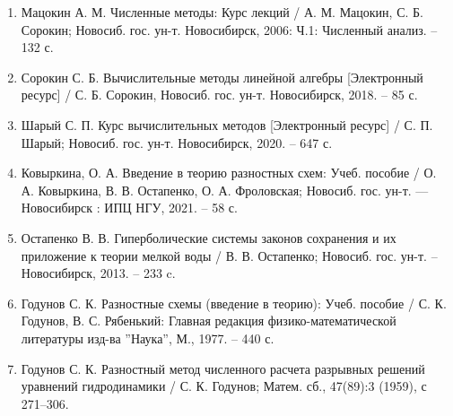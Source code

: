 \documentclass[../main.tex]{subfile}
\begin{document}
\begin{enumerate}[nosep]
	\item Мацокин А. М. Численные методы: Курс лекций / А. М. Мацокин,
		С. Б. Сорокин; Новосиб. гос. ун-т. Новосибирск, 2006: Ч.1:
		Численный анализ. -- 132 с.
	\item Сорокин С. Б. Вычислительные методы линейной алгебры [Электронный
		ресурс] / С. Б. Сорокин, Новосиб. гос. ун-т. Новосибирск, 2018.
		-- 85 с.
	\item Шарый С. П. Курс вычислительных методов [Электронный ресурс] /
		С. П. Шарый; Новосиб. гос. ун-т. Новосибирск, 2020. -- 647 с.
	\item Ковыркина, О. А. Введение в теорию разностных схем: Учеб. пособие
		/ О. А. Ковыркина, В. В. Остапенко, О. А. Фроловская; Новосиб.
		гос. ун-т. --- Новосибирск : ИПЦ НГУ, 2021. -- 58 с.
	\item Остапенко В. В. Гиперболические системы законов сохранения и их
		приложение к теории мелкой воды / В. В. Остапенко; Новосиб. гос.
		ун-т. -- Новосибирск, 2013. -- 233 c.
	\item Годунов С. К. Разностные схемы (введение в теорию): Учеб. пособие /
		С. К. Годунов, В. С. Рябенький: Главная редакция
		физико-математической литературы изд-ва ''Наука'', М., 1977. --
		440 с.
	\item Годунов С. К. Разностный метод численного расчета разрывных
		решений уравнений гидродинамики / С. К. Годунов; Матем. сб.,
		47(89):3 (1959), с 271–306.
\end{enumerate}
\end{document}
